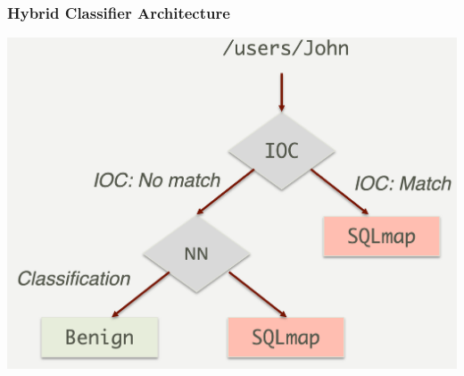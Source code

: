 \begin{frame}
\frametitle{Hybrid Classifier Architecture}
\includegraphics[width=\textwidth]{res/hybrid-architecture.png}
\end{frame}